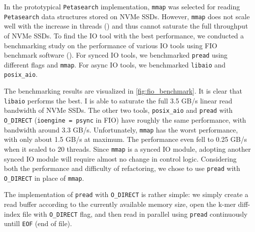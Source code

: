 In the prototypical \texttt{Petasearch} implementation, \texttt{mmap} was selected for reading \texttt{Petasearch} data structures stored on NVMe SSDs. However, \texttt{mmap} does not scale well with the increase in threads (\cite{papagiannis2020optimizing}) and thus cannot saturate the full throughput of NVMe SSDs. To find the IO tool with the best performance, we conducted a benchmarking study on the performance of various IO tools using FIO benchmark software (\cite{AxboeFlexibleIOTester2022}). For synced IO tools, we benchmarked \texttt{pread} using different flags and \texttt{mmap}. For async IO tools, we benchmarked \texttt{libaio} and \texttt{posix\_aio}.

The benchmarking results are visualized in \autoref{fig:fio_benchmark}. It is clear that \texttt{libaio} performs the best. I is able to saturate the full 3.5 GB/s linear read bandwidth of NVMe SSDs. The other two tools, \texttt{posix\_aio} and \texttt{pread} with \texttt{O\_DIRECT} (\texttt{ioengine = psync} in FIO) have roughly the same performance, with bandwidth around 3.3 GB/s. Unfortunately, \texttt{mmap} has the worst performance, with only about 1.5 GB/s at maximum. The performance even fell to 0.25 GB/s when it scaled to 20 threads. Since \texttt{mmap} is a synced IO module, adopting another synced IO module will require almost no change in control logic. Considering both the performance and difficulty of refactoring, we chose to use \texttt{pread} with \texttt{O\_DIRECT} in place of \texttt{mmap}.

The implementation of \texttt{pread} with \texttt{O\_DIRECT} is rather simple: we simply create a read buffer according to the currently available memory size, open the k-mer diff-index file with \texttt{O\_DIRECT} flag, and then read in parallel using \texttt{pread} continuously untill \texttt{EOF} (end of file).

